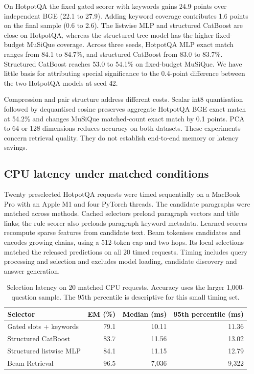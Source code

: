 \documentclass[twoside,a4paper,11pt]{article}
\begin{document}
On HotpotQA the fixed gated scorer with keywords gains 24.9 points over independent BGE (22.1 to 27.9). Adding keyword coverage contributes 1.6 points on the final sample (0.6 to 2.6). The listwise MLP and structured CatBoost are close on HotpotQA, whereas the structured tree model has the higher fixed-budget MuSiQue coverage. Across three seeds, HotpotQA MLP exact match ranges from 84.1 to 84.7\%, and structured CatBoost from 83.0 to 83.7\%. Structured CatBoost reaches 53.0 to 54.1\% on fixed-budget MuSiQue. We have little basis for attributing special significance to the 0.4-point difference between the two HotpotQA models at seed 42.

Compression and pair structure address different costs. Scalar int8 quantisation followed by dequantised cosine preserves aggregate HotpotQA BGE exact match at 54.2\% and changes MuSiQue matched-count exact match by 0.1 points. PCA to 64 or 128 dimensions reduces accuracy on both datasets. These experiments concern retrieval quality. They do not establish end-to-end memory or latency savings.

\subsection{CPU latency under matched conditions}
Twenty preselected HotpotQA requests were timed sequentially on a MacBook Pro with an Apple M1 and four PyTorch threads. The candidate paragraphs were matched across methods. Cached selectors preload paragraph vectors and title links; the rule scorer also preloads paragraph keyword metadata. Learned scorers recompute sparse features from candidate text. Beam tokenises candidates and encodes growing chains, using a 512-token cap and two hops. Its local selections matched the released predictions on all 20 timed requests. Timing includes query processing and selection and excludes model loading, candidate discovery and answer generation.

\begin{table}[htbp]\centering\small
\begin{tabular}{lrrr}\toprule
Selector & EM (\%) & Median (ms) & 95th percentile (ms)\\\midrule
Gated slots + keywords &79.1&10.11&11.36\\
Structured CatBoost &83.7&11.56&13.02\\
Structured listwise MLP &84.1&11.15&12.79\\
Beam Retrieval &96.5&7,036&9,322\\\bottomrule
\end{tabular}
\caption{Selection latency on 20 matched CPU requests. Accuracy uses the larger 1,000-question sample. The 95th percentile is descriptive for this small timing set.}\label{tab:time}\end{table}
\end{document}
